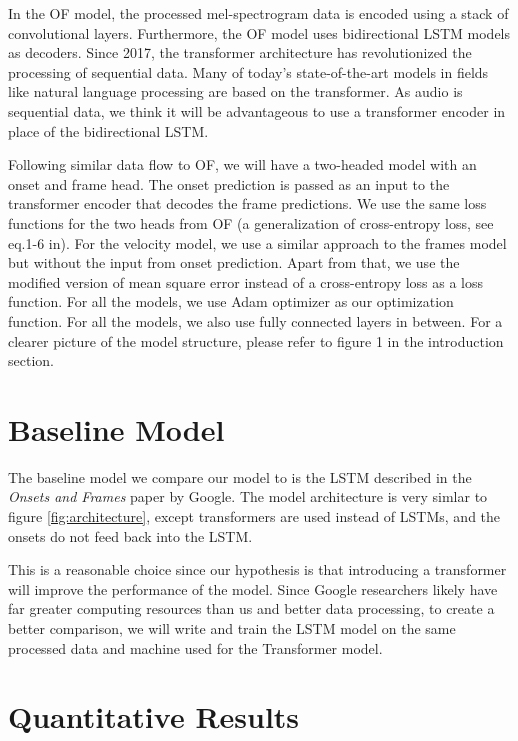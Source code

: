 \documentclass[a4paper,twocolumn,10pt]{article}
\begin{document}
In the OF model, the processed mel-spectrogram data is encoded using a stack of convolutional layers\cite{rainer}. Furthermore, the OF model uses bidirectional LSTM models as decoders. Since 2017, the transformer architecture has revolutionized the processing of sequential data\cite{attention}. Many of today’s state-of-the-art models in fields like natural language processing are based on the transformer. As audio is sequential data, we think it will be advantageous to use a transformer encoder in place of the bidirectional LSTM.

Following similar data flow to OF, we will have a two-headed model with an onset and frame head. The onset prediction is passed as an input to the transformer encoder that decodes the frame predictions. We use the same loss functions for the two heads from OF (a generalization of cross-entropy loss, see eq.1-6 in\cite{onsets_and_frames}). For the velocity model, we use a similar approach to the frames model but without the input from onset prediction. Apart from that, we use the modified version of mean square error instead of a cross-entropy loss as a loss function. For all the models, we use Adam optimizer as our optimization function.  For all the models, we also use fully connected layers in between. For a clearer picture of the model structure, please refer to figure 1 in the introduction section.

\section{Baseline Model}
The baseline model we compare our model to is the LSTM described in the \textit{Onsets and Frames} paper by Google\cite{onsets_and_frames}. The model architecture is very simlar to figure \ref{fig:architecture}, except transformers are used instead of LSTMs, and the onsets do not feed back into the LSTM.

This is a reasonable choice since our hypothesis is that introducing a transformer will improve the performance of the model. Since Google researchers likely have far greater computing resources than us and better data processing, to create a better comparison, we will write and train the LSTM model on the same processed data and machine used for the Transformer model.  



\section{Quantitative Results}
\end{document}

